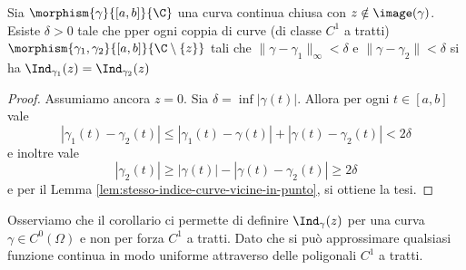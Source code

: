 \begin{corollary}
  Sia $\morphism{\gamma}{\left[ a,b \right]}{\C}$ una curva continua chiusa
  con $z \notin \image(\gamma)$. Esiste $\delta > 0$ tale che pper ogni
  coppia di curve (di classe $C^1$ a tratti)
  $\morphism{\gamma_1,\gamma_2}{\left[ a,b \right]}{\C \setminus\left\{ z
  \right\}}$ tali che $\|\gamma - \gamma_1\|_\infty < \delta$ e $\|\gamma
  - \gamma_2\| < \delta$ si ha $\Ind_{\gamma_1}(z)
= \Ind_{\gamma_2}(z)$
  \label{cor:carabinieri-tra-due-curve-convergenza-indice}
\end{corollary}
\begin{proof}
  Assumiamo ancora $z = 0$. Sia $\delta = \inf |\gamma(t)|$. Allora per ogni
  $t \in \left[ a,b \right]$ vale 
  \begin{equation*}
    |\gamma_1(t) - \gamma_2(t)| \le |\gamma_1(t) - \gamma(t)| + |\gamma(t)
    - \gamma_2(t)| < 2\delta
  \end{equation*}
  e inoltre vale 
  \begin{equation*}
    |\gamma_2(t)| \ge |\gamma(t)| - |\gamma(t) - \gamma_2(t)| \ge
    2\delta
  \end{equation*}
  e per il Lemma \ref{lem:stesso-indice-curve-vicine-in-punto}, si ottiene
  la tesi.
\end{proof}

\begin{remark}
    Osserviamo che il corollario ci permette di definire
    $\Ind_\gamma(z)$ per una curva $\gamma \in C^0(\Omega)$ e non
    per forza $C^1$ a tratti. Dato che si può approssimare qualsiasi funzione
    continua in modo uniforme attraverso delle poligonali $C^1$ a tratti.
    \label{rmk:generalizzazione-indice-curve-chiuse-continue}
\end{remark}

